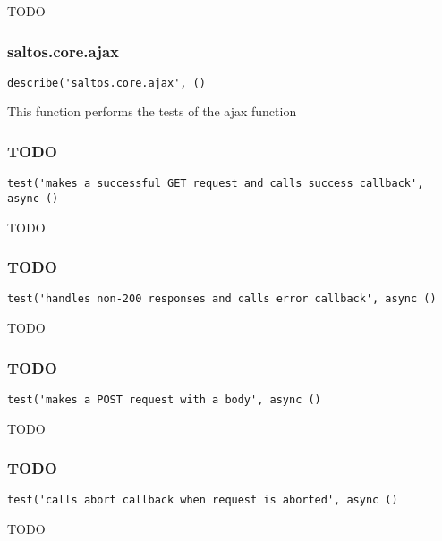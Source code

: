 \documentclass[a4paper]{article}
\begin{document}
TODO

\hypertarget{toc510}{}
\subsubsection{saltos.core.ajax}

\begin{lstlisting}
describe('saltos.core.ajax', ()
\end{lstlisting}

This function performs the tests of the ajax function

\hypertarget{toc511}{}
\subsubsection{TODO}

\begin{lstlisting}
test('makes a successful GET request and calls success callback', async ()
\end{lstlisting}

TODO

\hypertarget{toc512}{}
\subsubsection{TODO}

\begin{lstlisting}
test('handles non-200 responses and calls error callback', async ()
\end{lstlisting}

TODO

\hypertarget{toc513}{}
\subsubsection{TODO}

\begin{lstlisting}
test('makes a POST request with a body', async ()
\end{lstlisting}

TODO

\hypertarget{toc514}{}
\subsubsection{TODO}

\begin{lstlisting}
test('calls abort callback when request is aborted', async ()
\end{lstlisting}

TODO
\end{document}
